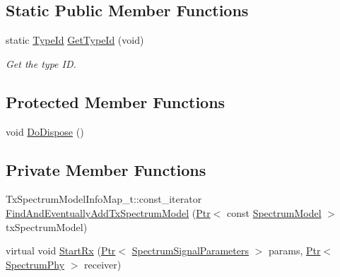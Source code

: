 \subsection*{Static Public Member Functions}
\begin{DoxyCompactItemize}
\item 
static \hyperlink{classns3_1_1TypeId}{Type\+Id} \hyperlink{classns3_1_1MultiModelSpectrumChannel_a4c20afc779f968ffa3d3adb3860bf77f}{Get\+Type\+Id} (void)
\begin{DoxyCompactList}\small\item\em Get the type ID. \end{DoxyCompactList}\end{DoxyCompactItemize}
\subsection*{Protected Member Functions}
\begin{DoxyCompactItemize}
\item 
void \hyperlink{classns3_1_1MultiModelSpectrumChannel_a902e1511a357b33b76477086a2678eb5}{Do\+Dispose} ()
\end{DoxyCompactItemize}
\subsection*{Private Member Functions}
\begin{DoxyCompactItemize}
\item 
Tx\+Spectrum\+Model\+Info\+Map\+\_\+t\+::const\+\_\+iterator \hyperlink{classns3_1_1MultiModelSpectrumChannel_a6056692c09015bd3d81df0d536a804c5}{Find\+And\+Eventually\+Add\+Tx\+Spectrum\+Model} (\hyperlink{classns3_1_1Ptr}{Ptr}$<$ const \hyperlink{classns3_1_1SpectrumModel}{Spectrum\+Model} $>$ tx\+Spectrum\+Model)
\item 
virtual void \hyperlink{classns3_1_1MultiModelSpectrumChannel_a9d8671b1d127dd0838b7efff971cacce}{Start\+Rx} (\hyperlink{classns3_1_1Ptr}{Ptr}$<$ \hyperlink{structns3_1_1SpectrumSignalParameters}{Spectrum\+Signal\+Parameters} $>$ params, \hyperlink{classns3_1_1Ptr}{Ptr}$<$ \hyperlink{classns3_1_1SpectrumPhy}{Spectrum\+Phy} $>$ receiver)
\end{DoxyCompactItemize}
